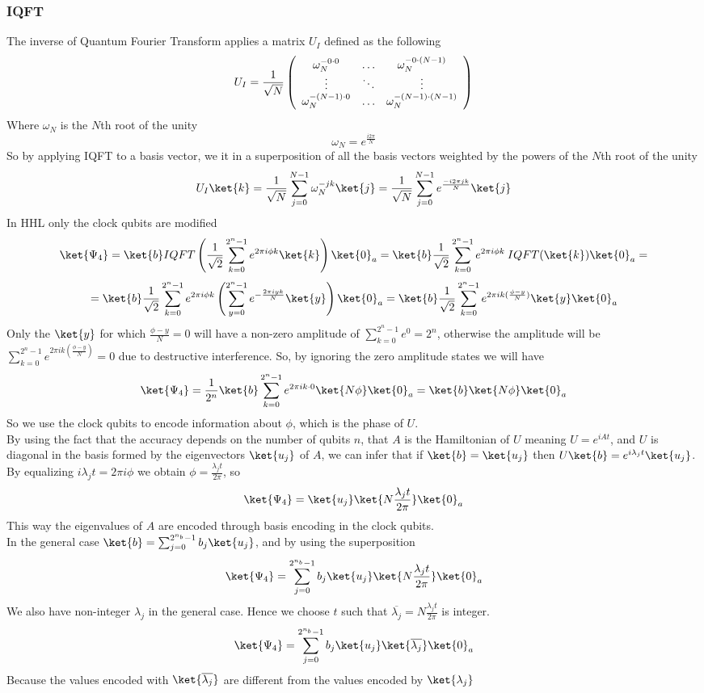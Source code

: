 \documentclass[10pt]{article}
\begin{document}
\subsubsection{IQFT}
The inverse of Quantum Fourier Transform applies a matrix $U_I$ defined as the following
$$U_I=\frac{1}{\sqrt{N}}\left(
	\begin{array}{c c c}
		\omega_N^{-0\cdot 0}&\ldots&\omega_N^{-0\cdot (N-1)}\\
		\vdots&\ddots&\vdots\\
		\omega_N^{-(N-1)\cdot 0}&\ldots&\omega_N^{-(N-1)\cdot(N-1)}
	\end{array}
\right)$$
Where $\omega_N$ is the $N$th root of the unity
$$\omega_N=e^{\frac{i2\pi}{N}}$$
So by applying IQFT to a basis vector, we it in a superposition of all the basis vectors weighted by the powers of the $N$th root of the unity
$$U_I\ket{k}=\frac{1}{\sqrt{N}}\sum_{j=0}^{N-1}\omega_N^{-jk}\ket{j} = \frac{1}{\sqrt{N}}\sum_{j=0}^{N-1}e^{\frac{-i2\pi jk}{N}}\ket{j}$$
In HHL only the clock qubits are modified
$$\ket{\Psi_4} = \ket{b}IQFT\left(\frac{1}{\sqrt{2}}\sum_{k=0}^{2^n-1}e^{2\pi i\phi k}\ket{k}\right)\ket{0}_a= \ket{b}\frac{1}{\sqrt{2}}\sum_{k=0}^{2^n-1}e^{2\pi i\phi k}\:IQFT(\ket{k})\ket{0}_a=$$
$$=\ket{b}\frac{1}{\sqrt{2}}\sum_{k=0}^{2^n-1}e^{2\pi i\phi k}\left(\sum_{y=0}^{2^n-1} e^{-\frac{2\pi iyk}{N}}\ket{y}\right)\ket{0}_a =\ket{b}\frac{1}{\sqrt{2}}\sum_{k=0}^{2^n-1}e^{2\pi ik(\frac{\phi-y}{N})}\ket{y}\ket{0}_a$$
Only the $\ket{y}$ for which $\frac{\phi - y}{N} = 0$ will have a non-zero amplitude of $\sum_{k=0}^{2^n-1}e^{0} = 2^n$, otherwise the amplitude will be $\sum_{k=0}^{2^n-1}e^{2\pi ik(\frac{\phi-y}{N})}=0$ due to destructive interference. So, by ignoring the zero amplitude states we will have
$$\ket{\Psi_4}=\frac{1}{2^n}\ket{b}\sum_{k=0}^{2^n-1}e^{2\pi ik\cdot 0}\ket{N\phi}\ket{0}_a = \ket{b}\ket{N\phi}\ket{0}_a$$
So we use the clock qubits to encode information about $\phi$, which is the phase of $U$.\\
By using the fact that the accuracy depends on the number of qubits $n$, that $A$ is the Hamiltonian of $U$ meaning $U = e^{iAt}$, and $U$ is diagonal in the basis formed by the eigenvectors $\ket{u_j}$ of $A$, we can infer that if $\ket{b}=\ket{u_j}$ then $U\ket{b}=e^{i\lambda_jt}\ket{u_j}$. By equalizing $i\lambda_jt=2\pi i\phi$ we obtain $\phi = \frac{\lambda_jt}{2\pi}$, so
$$\ket{\Psi_4}=\ket{u_j}\ket{N\frac{\lambda_jt}{2\pi}}\ket{0}_a$$
This way the eigenvalues of $A$ are encoded through basis encoding in the clock qubits.\\
In the general case $\ket{b} = \sum_{j=0}^{2^{n_b}-1}b_j\ket{u_j}$, and by using the superposition
$$\ket{\Psi_4}=\sum_{j=0}^{2^{n_b}-1}b_j\ket{u_j}\ket{N\frac{\lambda_jt}{2\pi}}\ket{0}_a$$
We also have non-integer $\lambda_j$ in the general case. Hence we choose $t$ such that $\overline{\lambda_j}=N\frac{\lambda_jt}{2\pi}$ is integer.
$$\ket{\Psi_4}=\sum_{j=0}^{2^{n_b}-1}b_j\ket{u_j}\ket{\overline{\lambda_j}}\ket{0}_a$$
Because the values encoded with $\ket{\overline{\lambda_j}}$ are different from the values encoded by $\ket{\lambda_j}$
\end{document}
